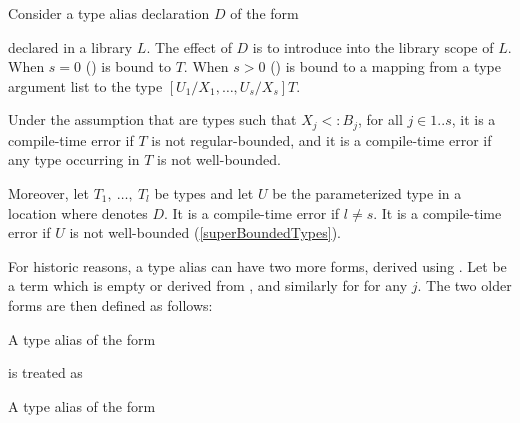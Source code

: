 \documentclass[makeidx]{article}
\begin{document}
{\LMHash{}%
Consider a type alias declaration $D$ of the form

\noindent
{}

\noindent
declared in a library $L$.
The effect of $D$ is to introduce \id{} into the library scope of $L$.
When $s = 0$
()
\id{} is bound to $T$.
When $s > 0$
()
\id{} is bound to a mapping from a type argument list
to the type
$[U_1/X_1, \ldots, U_s/X_s]T$.

\LMHash{}%
Under the assumption that  are types such that
$X_j <: B_j$, for all $j \in 1 .. s$,
it is a compile-time error if $T$ is not regular-bounded,
and it is a compile-time error if any type occurring in $T$ is not well-bounded.


\LMHash{}%
Moreover,
let $T_1,\ \ldots,\ T_l$ be types
and let $U$ be the parameterized type 
in a location where \id{} denotes $D$.
It is a compile-time error if $l \not= s$.
It is a compile-time error if $U$ is not well-bounded
(\ref{superBoundedTypes}).

\LMHash{}%
For historic reasons, a type alias can have two more forms,
derived using .
Let  be a term which is empty or derived from ,
and similarly for  for any $j$.
The two older forms are then defined as follows:

\LMHash{}%
A type alias of the form

\noindent
{}

\noindent
{}

\noindent
is treated as

\noindent
\code{\TYPEDEF{} \id<\TypeParametersStd> =}

\noindent
{}

\LMHash{}%
A type alias of the form

}
\end{document}
